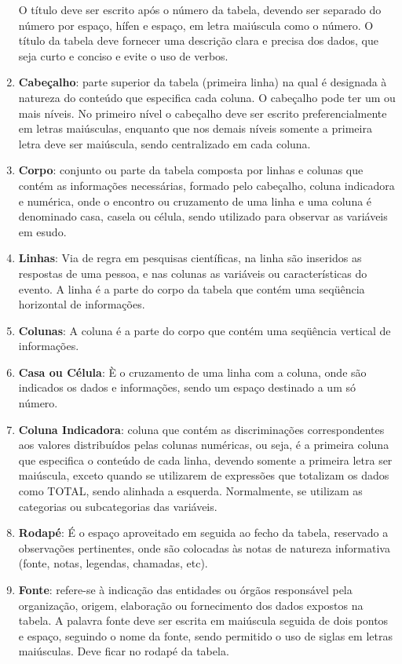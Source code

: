 \begin{enumerate}
O título deve ser escrito após o número da tabela, devendo ser separado do número por espaço, hífen e espaço, em letra maiúscula como o número. O título da tabela deve fornecer uma descrição clara e precisa dos dados, que seja curto e conciso e evite o uso de verbos.
\newpage
  \item \textbf{Cabeçalho}: parte superior da tabela (primeira linha) na qual é designada à natureza do conteúdo que especifica cada coluna. O cabeçalho pode ter um ou mais níveis. No primeiro nível o cabeçalho deve ser escrito preferencialmente em letras maiúsculas, enquanto que nos demais níveis somente a primeira letra deve ser maiúscula, sendo centralizado em cada coluna.
  \item \textbf{Corpo}: conjunto ou parte da tabela composta por linhas e colunas que contém as informações necessárias, formado pelo cabeçalho, coluna indicadora e numérica, onde o encontro ou cruzamento de uma linha e uma coluna é denominado casa, casela ou célula, sendo utilizado para observar as variáveis em esudo. 
  \item \textbf{Linhas}: Via de regra em pesquisas científicas, na linha são inseridos as respostas de uma pessoa, e nas colunas as variáveis ou características do evento. A linha é a parte do corpo da tabela que contém uma seqüência horizontal de informações.
  \item \textbf{Colunas}: A coluna é a parte do corpo que contém uma seqüência vertical de informações.
  \item \textbf{Casa ou Célula}: È o cruzamento de uma linha com a coluna, onde são indicados os dados e informações, sendo um espaço destinado a um só número.
  \item \textbf{Coluna Indicadora}: coluna que contém as discriminações correspondentes aos valores distribuídos pelas colunas numéricas, ou seja, é a primeira coluna que especifica o conteúdo de cada linha, devendo somente a primeira letra ser maiúscula, exceto quando se utilizarem de expressões que totalizam os dados como TOTAL, sendo alinhada a esquerda. Normalmente, se utilizam as categorias ou subcategorias das variáveis.
  \item \textbf{Rodapé}: É o espaço aproveitado em seguida ao fecho da tabela, reservado a observações pertinentes, onde são colocadas às notas de natureza informativa (fonte, notas, legendas, chamadas, etc).
  \item \textbf{Fonte}: refere-se à indicação das entidades ou órgãos responsável pela organização, origem, elaboração ou fornecimento dos dados expostos na tabela. A palavra fonte deve ser escrita em maiúscula seguida de dois pontos e espaço, seguindo o nome da fonte, sendo permitido o uso de siglas em letras maiúsculas. Deve ficar no rodapé da tabela. 

\end{enumerate}
